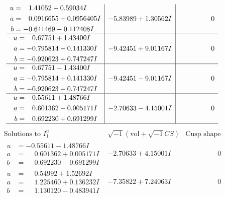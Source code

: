 \documentclass[1p]{elsarticle_modified}
\theoremstyle{definition}
\newcommand{\I}{\sqrt{-1}}
\begin{document}
$$\begin{array}{c|c|c}
\begin{aligned}
u &= \phantom{-}1.41052 - 0.59034 I \\
a &= \phantom{-}0.0916655 + 0.0956405 I \\
b &= -0.641469 - 0.112408 I\end{aligned}
 & -5.83989 + 1.30562 I & \phantom{-0.000000 } 0 \\ \hline\begin{aligned}
u &= \phantom{-}0.67751 + 1.43400 I \\
a &= -0.795814 - 0.141330 I \\
b &= -0.920623 + 0.747247 I\end{aligned}
 & -9.42451 + 9.01167 I & \phantom{-0.000000 } 0 \\ \hline\begin{aligned}
u &= \phantom{-}0.67751 - 1.43400 I \\
a &= -0.795814 + 0.141330 I \\
b &= -0.920623 - 0.747247 I\end{aligned}
 & -9.42451 - 9.01167 I & \phantom{-0.000000 } 0 \\ \hline\begin{aligned}
u &= -0.55611 + 1.48766 I \\
a &= \phantom{-}0.601362 - 0.005171 I \\
b &= \phantom{-}0.692230 + 0.691299 I\end{aligned}
 & -2.70633 - 4.15001 I & \phantom{-0.000000 } 0\\
 \hline 
 \end{array}$$\newpage$$\begin{array}{c|c|c}  
\text{Solutions to }I^u_{1}& \I (\text{vol} + \sqrt{-1}CS) & \text{Cusp shape}\\
 \hline 
\begin{aligned}
u &= -0.55611 - 1.48766 I \\
a &= \phantom{-}0.601362 + 0.005171 I \\
b &= \phantom{-}0.692230 - 0.691299 I\end{aligned}
 & -2.70633 + 4.15001 I & \phantom{-0.000000 } 0 \\ \hline\begin{aligned}
u &= \phantom{-}0.54992 + 1.52692 I \\
a &= \phantom{-}1.225460 + 0.136232 I \\
b &= \phantom{-}1.130120 - 0.483941 I\end{aligned}
 & -7.35822 + 7.24063 I & \phantom{-0.000000 } 0 \\ \hline\begin{aligned}

\end{aligned}
\end{array}$$
\end{document}
